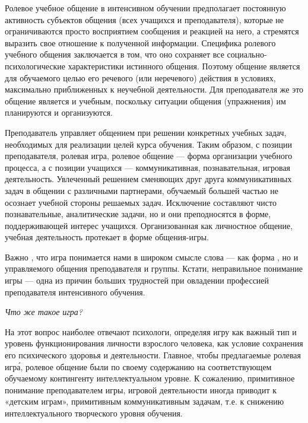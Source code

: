 Ролевое учебное общение в интенсивном обучении предполагает постоянную активность субъектов общения (всех учащихся и преподавателя), которые не ограничиваются просто восприятием сообщения и реакцией на него, а стремятся выразить свое отношение к полученной информации. Специфика ролевого учебного общения заключается в том, что оно сохраняет все социально-психологические характеристики истинного общения. Поэтому общение является для обучаемого целью его речевого (или неречевого) действия в условиях, максимально приближенных к неучебной  деятельности. Для преподавателя же это общение является и учебным, поскольку ситуации общения (упражнения) им планируются и организуются.

Преподаватель управляет общением при решении конкретных учебных задач, необходимых для реализации целей курса обучения. Таким образом, с позиции преподавателя, ролевая игра, ролевое общение --- форма организации учебного процесса, а с позиции учащихся --- коммуникативная, познавательная, игровая деятельность. Увлеченный решением сменяющих друг друга коммуникативных задач в общении с различными партнерами, обучаемый большей частью не осознает учебной стороны решаемых задач. Исключение составляют чисто познавательные, аналитические задачи, но и они преподносятся в форме, поддерживающей интерес учащихся. Организованная как личностное общение, учебная деятельность протекает в форме общения-игры.

Важно , что игра понимается нами в широком смысле слова --- как форма , но  и управляемого общения преподавателя и группы. Кстати, неправильное понимание игры --- одна из причин больших трудностей при овладении профессией преподавателя интенсивного обучения.

\textit{Что же такое игра?}

На этот вопрос наиболее  отвечают психологи, определяя игру как важный тип и уровень функционирования личности взрослого человека, как условие сохранения его психического здоровья и   деятельности. Главное, чтобы предлагаемые ролевая игр\'{а}, ролевое общение были по своему содержанию на соответствующем обучаемому контингенту интеллектуальном уровне. К сожалению, примитивное понимание преподавателем игры, игровой деятельности иногда приводит к «детским играм», примитивным коммуникативным задачам, т.е. к снижению интеллектуального творческого уровня обучения.

